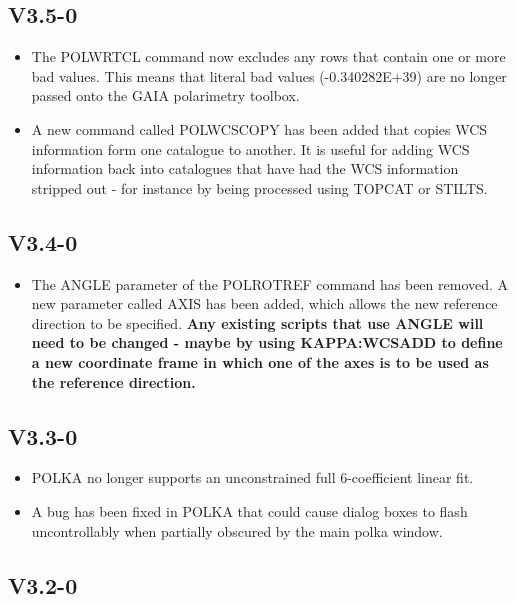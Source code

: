 \documentclass[twoside,11pt]{starlink}
\begin{document}
\subsection{V3.5-0}

\begin{itemize}
 \item The POLWRTCL command now excludes any rows that contain one or more
 bad values.  This means that literal bad values (-0.340282E+39) are no
 longer passed onto the GAIA polarimetry toolbox.
 \item A new command called POLWCSCOPY has been added that copies WCS
 information form one catalogue to another. It is useful for adding WCS
 information back into catalogues that have had the WCS information
 stripped out - for instance by being processed using TOPCAT or STILTS.
\end{itemize}

\subsection{V3.4-0}

\begin{itemize}
 \item The ANGLE parameter of the POLROTREF command has been removed. A new
 parameter called AXIS has been added, which allows the new reference
 direction to be specified. {\bf Any existing scripts that use ANGLE will
 need to be changed - maybe by using KAPPA:WCSADD to define a new coordinate
 frame in which one of the axes is to be used as the reference direction.}
\end{itemize}


\subsection{V3.3-0}

\begin{itemize}
 \item POLKA no longer supports an unconstrained full 6-coefficient linear fit.
 \item A bug has been fixed in POLKA that could cause dialog boxes to flash
  uncontrollably when partially obscured by the main polka window.
\end{itemize}


\subsection{V3.2-0}
\end{document}
